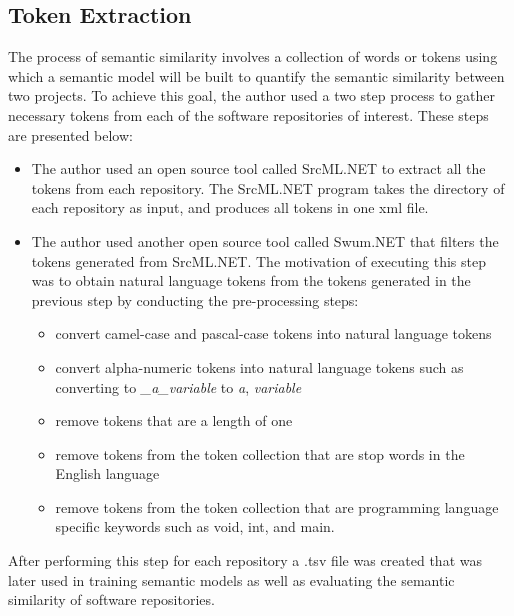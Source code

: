 \documentclass[conference]{IEEEtran}
\begin{document}
\subsection{Token Extraction}
\label{token_extract}
The process of semantic similarity involves a collection of words or tokens using which a semantic model will be built to quantify the semantic similarity between two projects. To achieve this goal, 
the author used a two step process to gather necessary tokens from each of the software repositories of interest. These steps are presented below: 
\begin{itemize}
\item{The author used an open source tool called SrcML.NET to extract all the tokens from each repository. The SrcML.NET program takes the directory of each repository as input, and produces all tokens in one xml file.}
\item{The author used another open source tool called Swum.NET that filters the tokens generated from SrcML.NET. The motivation of executing this step was to obtain natural language tokens from the tokens generated in the previous step by conducting the pre-processing steps: 
\begin{itemize}
\item{convert camel-case and pascal-case tokens into natural language tokens}
\item{convert alpha-numeric tokens into natural language tokens such as converting to \textit{\_a\_variable} to \textit{a}, \textit{variable}}
\item{remove tokens that are a length of one }
\item{remove tokens from the token collection that are stop words in the English language}
\item{remove tokens from the token collection that are programming language specific keywords such as void, int, and main. }
\end{itemize}
}
\end{itemize}
After performing this step for each repository a .tsv file was created that was later used in training semantic models as well as evaluating the semantic similarity of software repositories. 
\end{document}
